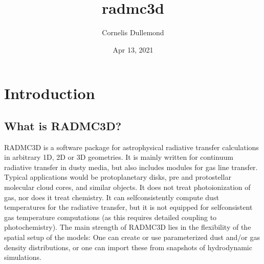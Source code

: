 \documentclass[letterpaper,10pt,english]{sphinxmanual}
\title{radmc3d}
\date{Apr 13, 2021}
\author{Cornelis Dullemond}
\begin{document}
\pagestyle{empty}
\sphinxmaketitle
\pagestyle{plain}
\sphinxtableofcontents
\pagestyle{normal}
\label{\detokenize{index::doc}}



\chapter{Introduction}
\label{\detokenize{introduction:introduction}}\label{\detokenize{introduction::doc}}

\section{What is RADMC\sphinxhyphen{}3D?}
\label{\detokenize{introduction:what-is-radmc-3d}}
RADMC\sphinxhyphen{}3D is a software package for astrophysical radiative transfer calculations
in arbitrary 1\sphinxhyphen{}D, 2\sphinxhyphen{}D or 3\sphinxhyphen{}D geometries. It is mainly written for continuum
radiative transfer in dusty media, but also includes modules for gas line
transfer. Typical applications would be protoplanetary disks, pre\sphinxhyphen{} and
proto\sphinxhyphen{}stellar molecular cloud cores, and similar objects. It does not treat
photoionization of gas, nor does it treat chemistry. It can self\sphinxhyphen{}consistently
compute dust temperatures for the radiative transfer, but it is not equipped for
self\sphinxhyphen{}consistent gas temperature computations (as this requires detailed coupling
to photochemistry). The main strength of RADMC\sphinxhyphen{}3D lies in the flexibility of the
spatial setup of the models: One can create or use parameterized dust and/or gas
density distributions, or one can import these from snapshots of hydrodynamic
simulations.
\end{document}
